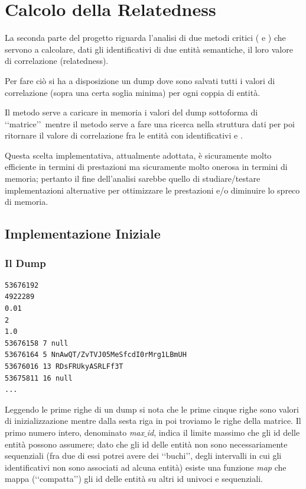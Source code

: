 \chapter{Calcolo della Relatedness}

La seconda parte del progetto riguarda l'analisi di due metodi critici ( e ) che servono a 
calcolare, dati gli identificativi di due entità semantiche, il loro valore di correlazione (relatedness). 

Per fare ciò si ha a disposizione un dump dove sono salvati tutti i valori di correlazione (sopra una certa soglia minima) per ogni coppia di entità. 

Il metodo  serve a caricare in memoria i valori del dump 
sottoforma di \lq\lq matrice\rq\rq\ mentre il metodo  serve a fare una ricerca nella struttura dati per poi ritornare il valore di 
correlazione fra le entità con identificativi  e .

Questa scelta implementativa, attualmente adottata, è sicuramente molto efficiente in termini di prestazioni ma sicuramente molto onerosa in termini di memoria; 
pertanto il fine dell'analisi sarebbe quello di studiare/testare implementazioni alternative per ottimizzare le prestazioni e/o diminuire lo spreco di memoria.  

\section{Implementazione Iniziale}

\subsection{Il Dump}
\begin{lstlisting}[style=TeXStyle, caption=Estratto del dump]
53676192
4922289
0.01
2
1.0
53676158 7 null
53676164 5 NnAwQT/ZvTVJ05MeSfcdI0rMrg1LBmUH
53676016 13 RDsFRUkyASRLFf3T
53675811 16 null
...
\end{lstlisting}

Leggendo le prime righe di un dump si nota che le prime cinque righe sono valori di inizializzazione mentre dalla sesta riga in poi troviamo le righe della matrice.
Il primo numero intero, denominato \textit{max$\_$id}, indica il limite massimo che gli id delle entità possono assumere; 
dato che gli id delle entità non sono necessariamente sequenziali 
(fra due di essi potrei avere dei \lq\lq buchi\rq\rq, degli intervalli in cui gli identificativi non sono associati ad alcuna entità) 
esiste una funzione \textit{map} che mappa (\lq\lq compatta\rq\rq) gli id delle entità su altri id univoci e sequenziali. 

